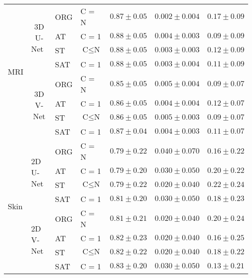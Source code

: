 \documentclass{article}
\begin{document}
\begin{table}
\begin{tabular}{lcllccc}
\multirow{8}{*}{MRI} & \multirow{4}{*}{3D U-Net~\cite{cciccek20163d}} & ORG & C = N & $0.87\pm0.05$ & $0.002\pm0.004$ & $0.17\pm0.09$ \\
 &  & AT & C = 1 & $0.88\pm0.05$ & $0.004\pm0.003$ & $0.09\pm0.09$ \\
 &  & ST & $\text{C} \leqslant \text{N}$ & $0.88\pm0.05$ & $0.003\pm0.003$ & $0.12\pm0.09$ \\
 &  & SAT & C = 1 & $0.88\pm0.05$ & $0.003\pm0.004$ & $0.11\pm0.09$ \\ \cline{2-7} 
 & \multirow{4}{*}{3D V-Net\cite{milletari2016v}} & ORG & C = N & $0.85\pm0.05$ & $0.005\pm0.004$ & $0.09\pm0.07$ \\
 &  & AT & C = 1 & $0.86\pm0.05$ & $0.004\pm0.004$ & $0.12\pm0.07$ \\
 &  & ST & $\text{C} \leqslant \text{N}$ & $0.86\pm0.05$ & $0.005\pm0.003$ & $0.09\pm0.07$ \\
 &  & SAT & C = 1 & $0.87\pm0.04$ & $0.004\pm0.003$ & $0.11\pm0.07$ \\ \hline
\multirow{8}{*}{Skin} & \multicolumn{1}{l}{\multirow{4}{*}{2D U-Net~\cite{ronneberger2015u}}} & ORG & C = N & \multicolumn{1}{l}{$0.79\pm0.22$} & \multicolumn{1}{l}{$0.040\pm0.070$} & \multicolumn{1}{l}{$0.16\pm0.22$} \\
 & \multicolumn{1}{l}{} & AT & C = 1 & \multicolumn{1}{l}{$0.79\pm0.20$} & \multicolumn{1}{l}{$0.030\pm0.050$} & \multicolumn{1}{l}{$0.20\pm0.22$} \\
 & \multicolumn{1}{l}{} & ST & $\text{C} \leqslant \text{N}$ & \multicolumn{1}{l}{$0.79\pm0.22$} & \multicolumn{1}{l}{$0.020\pm0.040$} & \multicolumn{1}{l}{$0.22\pm0.24$} \\
 & \multicolumn{1}{l}{} & SAT & C = 1 & \multicolumn{1}{l}{$0.81\pm0.20$} & \multicolumn{1}{l}{$0.030\pm0.050$} & \multicolumn{1}{l}{$0.18\pm0.23$} \\ \cline{2-7} 
 & \multicolumn{1}{l}{\multirow{4}{*}{2D V-Net}} & ORG & C = N & \multicolumn{1}{l}{$0.81\pm0.21$} & \multicolumn{1}{l}{$0.020\pm0.040$} & \multicolumn{1}{l}{$0.20\pm0.24$} \\
 & \multicolumn{1}{l}{} & AT & C = 1 & \multicolumn{1}{l}{$0.82\pm0.23$} & \multicolumn{1}{l}{$0.020\pm0.040$} & \multicolumn{1}{l}{$0.16\pm0.25$} \\
 & \multicolumn{1}{l}{} & ST & $\text{C} \leqslant \text{N}$ & \multicolumn{1}{l}{$0.82\pm0.22$} & \multicolumn{1}{l}{$0.020\pm0.040$} & \multicolumn{1}{l}{$0.18\pm0.22$} \\
 & \multicolumn{1}{l}{} & SAT & C = 1 & \multicolumn{1}{l}{$0.83\pm0.20$} & \multicolumn{1}{l}{$0.030\pm0.050$} & \multicolumn{1}{l}{$0.13\pm0.21$} \\ \hline
\end{tabular}
\end{table}
\end{document}

